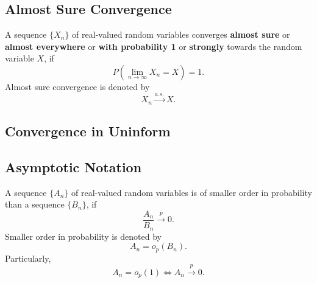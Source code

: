 \begin{theorem} \label{thm:cramer-wold-theorem}

\end{theorem}

\subsection{Almost Sure Convergence}

\begin{definition}
    A sequence $\{X_n\}$ of real-valued random variables converges \textbf{almost sure} or \textbf{almost everywhere} or \textbf{with probability 1} or \textbf{strongly} towards the random variable $X$, if
    \begin{equation}
        P\left(\lim_{n\to\infty}X_n=X\right)=1.
    \end{equation}
    Almost sure convergence is denoted by
    \begin{equation}
        X_n \stackrel{a.s.}{\rightarrow} X.
    \end{equation}
\end{definition}

\begin{remark}

\end{remark}

\subsection{Convergence in Uninform}

\begin{definition}

\end{definition}

\subsection{Asymptotic Notation}

\begin{definition}
    A sequence $\{A_n\}$ of real-valued random variables is of smaller order in probability than a sequence $\{B_n\}$, if
    \begin{equation}
        \frac{A_n}{B_n}\stackrel{p}{\rightarrow}0.
    \end{equation}
    Smaller order in probability is denoted by
    \begin{equation}
        A_n=o_p(B_n).
    \end{equation}
    Particularly,
    \begin{equation}
        A_n=o_p(1)\iff A_n\stackrel{p}{\rightarrow}0.
    \end{equation}
\end{definition}

